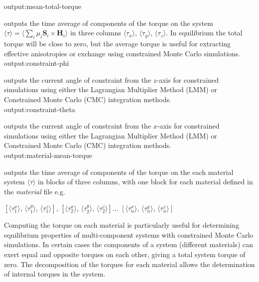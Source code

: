 {\zicf output:mean-total-torque} outputs the time average of components of the torque on the system $\langle\tau\rangle = \langle\sum_i \mu_i \mathbf{S}_i \times \mathbf{H}_i \rangle$ in three columns $\langle\tau_x \rangle$, $\langle\tau_y \rangle$, $\langle\tau_z \rangle$. In equilibrium the total torque will be close to zero, but the average torque is useful for extracting effective anisotropies or exchange using constrained Monte Carlo simulations.\\

{\zicf output:constraint-phi} outputs the current angle of constraint from the $z$-axis for constrained simulations using either the Lagrangian Multiplier Method (LMM) or Constrained Monte Carlo (CMC) integration methods.\\

{\zicf output:constraint-theta} outputs the current angle of constraint from the $x$-axis for constrained simulations using either the Lagrangian Multiplier Method (LMM) or Constrained Monte Carlo (CMC) integration methods.\\



{\zicf output:material-mean-torque} outputs the time average of components of the torque on the each material system $\langle\tau\rangle$ in blocks of three columns, with one block for each material defined in the \textit{material} file e.g.

\begin{center}
$\left[ \langle\tau_1^x \rangle \right.$, $\langle\tau_1^y \rangle$, $\left. \langle\tau_1^z \rangle \right]$,
$\left[ \langle\tau_2^x \rangle \right.$, $\langle\tau_2^y \rangle$, $\left. \langle\tau_2^z \rangle \right]$...
$\left[ \langle\tau_n^x \rangle \right.$, $\langle\tau_n^y \rangle$, $\left. \langle\tau_n^z \rangle \right]$
\end{center}

Computing the torque on each material is particularly useful for determining equilibrium properties of multi-component systems with constrained Monte Carlo simulations. In certain cases the components of a system (different materials) can exert equal and opposite torques on each other, giving a total system torque of zero. The decomposition of the torques for each material allows the determination of internal torques in the system.\\


